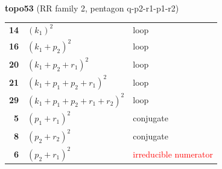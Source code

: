 \documentclass[10pt]{article}
\begin{document}
\begin{minipage}[t]{0.48\textwidth}
{}\\[2mm]\textbf{topo53} (RR family 2, pentagon q-p2-r1-p1-r2)\\[2pt]{\footnotesize\begin{tabular}{@{}r@{\ \ }l@{\ \ }l@{}}\textbf{14} & $(k_1)^2$ & loop\\
\textbf{16} & $(k_1+p_2)^2$ & loop\\
\textbf{20} & $(k_1+p_2+r_1)^2$ & loop\\
\textbf{21} & $(k_1+p_1+p_2+r_1)^2$ & loop\\
\textbf{29} & $(k_1+p_1+p_2+r_1+r_2)^2$ & loop\\
\textbf{5} & $(p_1+r_1)^2$ & conjugate\\
\textbf{8} & $(p_2+r_2)^2$ & conjugate\\
\textbf{6} & $(p_2+r_1)^2$ & \textcolor{red}{irreducible numerator}\\\end{tabular}}\end{minipage}\hfill%
\end{document}
